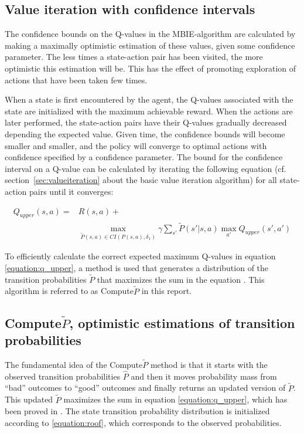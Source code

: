 \subsection{Value iteration with confidence intervals}
\label{sec:modification_conf_interval}

The confidence  bounds on the Q-values in the MBIE-algorithm are calculated by
making a maximally optimistic estimation of these values, given some confidence
parameter. The less times a state-action pair has been visited, the more
optimistic this estimation will be. This has the effect of promoting
exploration of actions that have been taken few times. 

When a state is first encountered by the agent, the Q-values associated with
the state are initialized with the maximum achievable reward. When the actions
are later performed, the state-action pairs have their Q-values gradually
decreased depending the expected value. Given time, the confidence bounds will
become smaller and smaller, and the policy will converge to optimal actions
with confidence specified by a confidence parameter. The bound for the
confidence interval on a Q-value can be calculated by iterating the following
equation (cf. section~\ref{sec:valueiteration} about the basic value iteration
algorithm) for all state-action pairs until it converges:

\begin{align}
\label{equation:q_upper}
Q_{upper} (s, a) = & R(s, a) + \nonumber \\
& \operatorname*{max}_{\tilde{P}(s, a)\in CI(P(s, a), \delta_1)} \gamma \sum_{s'} \tilde{P}(s'|s, a)\operatorname*{max}_{a'} Q_{upper}(s', a')
\end{align}


To efficiently calculate the correct expected maximum Q-values in equation
\eqref{equation:q_upper}, a method is used that generates a distribution of the
transition probabilities $\tilde{P}$ that maximizes the sum in the equation
\parencite{Strehl20081309}. This algorithm is referred to as Compute$\tilde{P}$
in this report.

\subsection{Compute$\tilde{P}$, optimistic estimations of transition probabilities}

The fundamental idea of the Compute$\tilde{P}$ method is that it starts with
the observed transition probabilities $\hat{P}$ and then it moves probability
mass from ``bad'' outcomes to ``good'' outcomes and finally returns an updated
version of $\tilde{P}$. This updated $\tilde{P}$ maximizes the sum in equation
\eqref{equation:q_upper}, which has been proved in \textcite{Strehl20081309}.
The state transition probability distribution is initialized according to
\eqref{equation:roof}, which corresponds to the observed probabilities.

